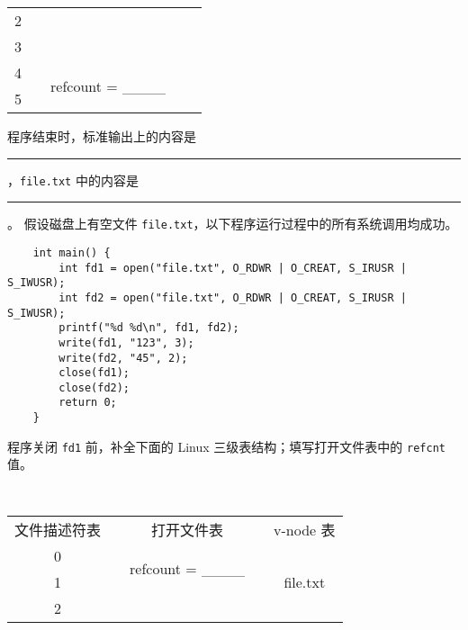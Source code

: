 \begin{problems}
\begin{table}[H]
\begin{tabular}{ccccc}
                \multicolumn{1}{|c|}{2} &  &  & \multicolumn{1}{c|}{} & \multicolumn{1}{c|}{} \\ \cline{1-1}
                \multicolumn{1}{|c|}{3} &  &  & \multicolumn{1}{c|}{} & \multicolumn{1}{c|}{} \\ \cline{1-1} \cline{3-3}
                \multicolumn{1}{|c|}{4} & \multicolumn{1}{c|}{} & \multicolumn{1}{c|}{\multirow{2}{*}{refcount = \_\_\_\_}} & \multicolumn{1}{c|}{} & \multicolumn{1}{c|}{} \\ \cline{1-1}
                \multicolumn{1}{|c|}{5} & \multicolumn{1}{c|}{} & \multicolumn{1}{c|}{} & \multicolumn{1}{c|}{} & \multicolumn{1}{c|}{} \\ \cline{1-1} \cline{3-3} \cline{5-5} 
            \end{tabular}
        \end{table}
        \qn 程序结束时，标准输出上的内容是 \rule{3.5cm}{0.25mm}，\verb|file.txt| 中的内容是 \rule{3.5cm}{0.25mm}。
        \pro 假设磁盘上有空文件 \verb|file.txt|，以下程序运行过程中的所有系统调用均成功。
        \begin{verbatim}
    int main() {
        int fd1 = open("file.txt", O_RDWR | O_CREAT, S_IRUSR | S_IWUSR); 
        int fd2 = open("file.txt", O_RDWR | O_CREAT, S_IRUSR | S_IWUSR); 
        printf("%d %d\n", fd1, fd2);
        write(fd1, "123", 3);
        write(fd2, "45", 2);
        close(fd1);
        close(fd2);
        return 0;
    }
        \end{verbatim}
        \qn 程序关闭 \verb|fd1| 前，补全下面的 Linux 三级表结构；填写打开文件表中的 \verb|refcnt| 值。
        \begin{table}[H]
            \tt
            \centering
            \begin{tabular}{ccccc}
                文件描述符表 & {\qquad \qquad \qquad} & 打开文件表 & {\qquad \qquad \qquad} & v-node 表 \\ \cline{1-1} \cline{3-3} \cline{5-5} 
                \multicolumn{1}{|c|}{0} & \multicolumn{1}{c|}{} & \multicolumn{1}{c|}{\multirow{2}{*}{refcount = \_\_\_\_}} & \multicolumn{1}{c|}{} & \multicolumn{1}{c|}{\multirow{6}{*}{file.txt}} \\ \cline{1-1}
                \multicolumn{1}{|c|}{1} & \multicolumn{1}{c|}{} & \multicolumn{1}{c|}{} & \multicolumn{1}{c|}{} & \multicolumn{1}{c|}{} \\ \cline{1-1} \cline{3-3}
                \multicolumn{1}{|c|}{2} &  &  & \multicolumn{1}{c|}{} & \multicolumn{1}{c|}{} \\ \cline{1-1}

\end{tabular}
\end{table}
\end{problems}
